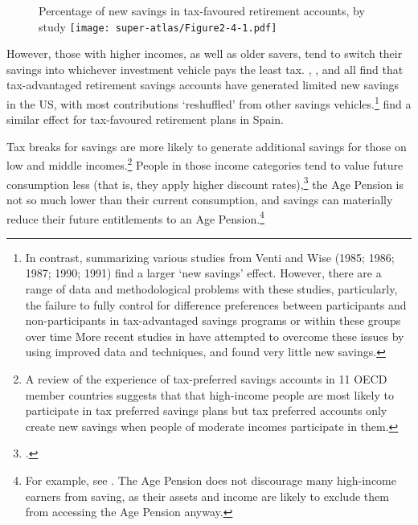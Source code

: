 \begin{figure}
%
{Percentage of new savings in tax-favoured retirement accounts, by study}\label{fig:SUPER-2-4}
\texttt{[image: super-atlas/Figure2-4-1.pdf]}

\end{figure}

However, those with higher incomes, as well as older savers, tend to switch their savings into whichever investment vehicle pays the least tax.  \textcite{EngenGale2000}, \textcite{AttanasioBanksWakefield2004}, and \textcite{Benjamin2003} all find that tax\nobreakdash-advantaged retirement savings accounts have generated limited new savings in the US, with most contributions ‘reshuffled’ from other savings vehicles.\footnote{In contrast, \textcite{PoterbaVentiWise1996} summarizing various studies from Venti and Wise (1985; 1986; 1987; 1990; 1991) find a larger ‘new savings’ effect. 
However, there are a range of data and methodological problems with these studies, particularly, the failure to fully control for difference preferences between participants and non-participants in tax-advantaged savings programs or within these groups over time \textcite{EngenGaleScholz1996} More recent studies in \textcites{Benjamin2003}{EngenGale2000}  have attempted to overcome these issues by using improved data and techniques, and found very little new savings.}    \textcite{AyusoJimenoVillanueva2007} find a similar effect for tax-favoured retirement plans in Spain. 

Tax breaks for savings are more likely to generate additional savings for those on low and middle incomes.\footnote{\textcite{OECD2007EncourageSavingsThroughTaxPreferredAccounts} A review of the experience of tax-preferred savings accounts in 11 OECD member countries suggests that that high-income people are most likely to participate in tax preferred savings plans but tax preferred accounts only create new savings when people of moderate incomes participate in them.}
People in those income categories tend to value future consumption less (that is, they apply higher discount rates),\footcite{DynanSkinnerZeldes2004} the Age Pension is not so much lower than their current consumption, and savings can materially reduce their future entitlements to an Age Pension.\footnote{For example, see \textcite{BlundellEmmersonWafefield2006}. The Age Pension does not discourage many high-income earners from saving, as their assets and income are likely to exclude them from accessing the Age Pension anyway.} 

